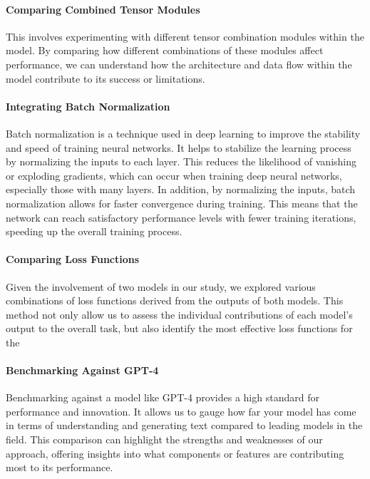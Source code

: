 \paragraph*{Comparing Combined Tensor Modules}
\label{par:4_comparing_combined_tensor_modules}
This involves experimenting with different tensor combination modules within the model. By comparing how different combinations of these modules affect performance, we can understand how the architecture and data flow within the model contribute to its success or limitations.

\paragraph*{Integrating Batch Normalization}
\label{par:4_integrating_batch_normalization}
Batch normalization is a technique used in deep learning to improve the stability and speed of training neural networks. It helps to stabilize the learning process by normalizing the inputs to each layer. This reduces the likelihood of vanishing or exploding gradients, which can occur when training deep neural networks, especially those with many layers. In addition, by normalizing the inputs, batch normalization allows for faster convergence during training. This means that the network can reach satisfactory performance levels with fewer training iterations, speeding up the overall training process. 

\paragraph*{Comparing Loss Functions}
\label{par:4_comparing_loss_functions}
Given the involvement of two models in our study, we explored various combinations of loss functions derived from the outputs of both models. This method not only allow us to assess the individual contributions of each model's output to the overall task, but also identify the most effective loss functions for the 

\paragraph*{Benchmarking Against GPT-4}
\label{par:4_benchmarking_against_gpt-4}
Benchmarking against a model like GPT-4 provides a high standard for performance and innovation. It allows us to gauge how far your model has come in terms of understanding and generating text compared to leading models in the field. This comparison can highlight the strengths and weaknesses of our approach, offering insights into what components or features are contributing most to its performance. 

